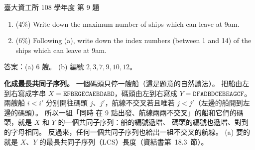 \begin{pastexam}[label={px:ntu-108-dsaa-09}]{臺大資工所 108 學年度 第 9 題}
\begin{enumerate}[label=(\alph*)]
\item (4\%) Write down the maximum number of ships which can leave at 9am.
\item (6\%) Following (a), write down the index numbers (between 1 and 14) of the ships which can
leave at 9am.
\end{enumerate}
\end{pastexam}

\begin{pastsoln}
答案：(a) $6$ 艘。 (b) 編號 $2, 3, 7, 9, 10, 12$。

\textbf{化成最長共同子序列。} 一個碼頭只停一艘船（這是題意的自然讀法）。 把船由左到右寫成字串
$X = \texttt{EFBEGECAEBDABD}$，碼頭由左到右寫成 $Y = \texttt{DFADBDCEBEAGCF}$。 兩艘船 $i < i'$
分別開往碼頭 $j$、$j'$，航線不交叉若且唯若 $j < j'$（左邊的船開到左邊的碼頭）。 所以一組「同時
在 9 點出發、航線兩兩不交叉」的船和它們的碼頭，就是 $X$ 和 $Y$ 的一個共同子序列：船的編號遞增、
碼頭的編號也遞增、對到的字母相同。 反過來，任何一個共同子序列也給出一組不交叉的航線。 (a) 要的
就是 $X$、$Y$ 的最長共同子序列（LCS）長度（資結書第~18.3~節）。


\end{pastsoln}

